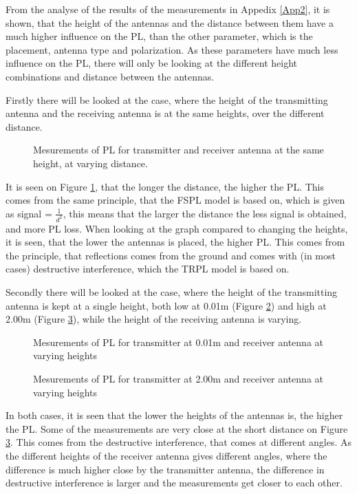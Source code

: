 From the analyse of the results of the measurements in Appedix \ref{App2}, it is shown, that the height of the antennas and the distance between them have a much higher influence on the PL, than the other parameter, which is the placement, antenna type and polarization. As these parameters have much less influence on the PL, there will only be looking at the different height combinations and distance between the antennas.

Firstly there will be looked at the case, where the height of the transmitting antenna and the receiving antenna is at the same heights, over the different distance.

\begin{figure}[!htbp]
\centering

\caption{Mesurements of PL for transmitter and receiver antenna at the same height, at varying distance.}
\label{Meas1}
\end{figure}

It is seen on Figure \ref{Meas1}, that the longer the distance, the higher the PL. This comes from the same principle, that the FSPL model is based on, which is given as signal = $\frac{1}{d^{2}}$, this means that the larger the distance the less signal is obtained, and more PL loss. When looking at the graph compared to changing the heights, it is seen, that the lower the antennas is placed, the higher PL. This comes from the principle, that reflections comes from the ground and comes with (in most cases) destructive interference, which the TRPL model is based on. 

Secondly there will be looked at the case, where the height of the transmitting antenna is kept at a single height, both low at 0.01m (Figure \ref{Meas2}) and high at 2.00m (Figure \ref{Meas3}), while the height of the receiving antenna is varying.

\begin{figure}[!htbp]
\centering

\caption{Mesurements of PL for transmitter at 0.01m and receiver antenna at varying heights}
\label{Meas2}
\end{figure}

\begin{figure}[!htbp]
\centering

\caption{Mesurements of PL for transmitter at 2.00m and receiver antenna at varying heights}
\label{Meas3}
\end{figure}

In both cases, it is seen that the lower the heights of the antennas is, the higher the PL. Some of the measurements are very close at the short distance on Figure \ref{Meas3}. This comes from the destructive interference, that comes at different angles. As the different heights of the receiver antenna gives different angles, where the difference is much higher close by the transmitter antenna, the difference in destructive interference is larger and the measurements get closer to each other.

